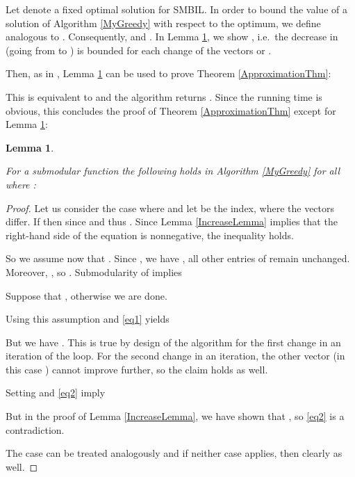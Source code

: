 \documentclass{article}
\theoremstyle{plain}
\newtheorem{lemma}[theorem]{Lemma}
\theoremstyle{definition}
\begin{document}
Let  denote a fixed optimal solution for SMBIL. 
In order to bound the value of a solution of Algorithm \ref{MyGreedy} with respect to the optimum, 
we define  analogous to \cite{DoubleGreedy}. 
Consequently,  and . 
In Lemma \ref{OptBoundLemma}, we show , 
i.e.\ the decrease in  (going from  to ) is bounded for each change of the vectors  or .

Then, as in \cite{DoubleGreedy}, Lemma \ref{OptBoundLemma} can be used to prove Theorem \ref{ApproximationThm}:




This is equivalent to  and the algorithm returns . 
Since the running time is obvious, 
this concludes the proof of Theorem \ref{ApproximationThm} except for Lemma \ref{OptBoundLemma}: 

\begin{lemma}\label{OptBoundLemma}

For a submodular function   the following holds in Algorithm \ref{MyGreedy} 
for all  where :

\hspace*{2 cm}  
\end{lemma}
\begin{proof}
Let us consider the case where   and let  be the index, where the vectors differ. 
 If  then  
 since  and thus .
 Since Lemma \ref{IncreaseLemma} implies that the right-hand side of the equation is nonnegative, the inequality holds. 
 
So we assume now that .
Since , we have , all other entries of  remain unchanged.
Moreover, , so .
Submodularity of  implies


Suppose that  , otherwise we are done.

Using this assumption and \eqref{eq1} yields
 

But we have .
This is true by design of the algorithm for the first change in an iteration of the loop. 
For the second change in an iteration, the other vector (in this case ) cannot improve further, so the claim holds as well. 

Setting  and \eqref{eq2} imply
 


But in the proof of Lemma \ref{IncreaseLemma}, we have shown that 
, so \eqref{eq2} is a contradiction.
 
The case  can be treated analogously and if neither case applies, then clearly 
 as well.  
\end{proof}
\end{document}
